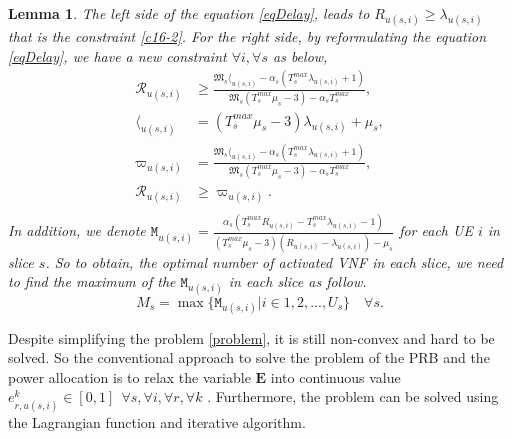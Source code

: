 \documentclass[conference]{IEEEtran}
\newtheorem{lemma}{Lemma}
\begin{document}
\begin{lemma}
The left side of the equation \eqref{eqDelay}, leads to $R_{u(s,i)} \geq \lambda_{u(s,i)}$ that is the constraint \eqref{c16-2}. 
For the right side, by reformulating the equation \eqref{eqDelay}, we have a new constraint $\forall i, \forall s$ as below,
\begin{equation}\label{RM}
\begin{split}
\mathcal{R}_{u(s,i)} &\geq \frac{\mathfrak{M}_s \mathit{\langle}_{u(s,i)} - \alpha_s(T^{max}_s\lambda_{u(s,i)} +1) }{\mathfrak{M}_s (T^{max}_s\mu_s-3)-\alpha_s T^{max}_s},\\
 \mathit{\langle}_{u(s,i)}&=(T^{max}_s\mu_s-3)\lambda_{u(s,i)} + \mu_s,\\
\varpi_{u(s,i)} &= \frac{\mathfrak{M}_s \mathit{\langle}_{u(s,i)} - \alpha_s(T^{max}_s\lambda_{u(s,i)} +1) }{\mathfrak{M}_s (T^{max}_s\mu_s-3)-\alpha_s T^{max}_s},\\
\mathcal{R}_{u(s,i)} &\geq \varpi_{u(s,i)}. \\
\end{split}
\end{equation}
In addition, we denote $\mathtt{M}_{u(s,i)} = \frac{\alpha_s(T^{max}_s R_{u(s,i)}-T^{max}_s\lambda_{u(s,i)} -1)}{(T^{max}_s\mu_s-3)(R_{u(s,i)}-\lambda_{u(s,i)}) - \mu_s }$ for each UE $i$ in slice $s$.
So to obtain, the optimal number of activated VNF in each slice, we need to find the maximum of the
$\mathtt{M}_{u(s,i)}$ in each slice as follow.
\begin{equation}
M_s = \max\{\mathtt{M}_{u(s,i)} | i \in 1,2,..., U_s\} \quad \forall s .
\end{equation}
\end{lemma}
Despite simplifying the problem \eqref{problem}, it is still non-convex and hard to be solved.
So the conventional approach to solve the problem of the PRB and the power allocation is to relax the variable $\mathbf{E}$ into continuous value $e_{r,u(s,i)}^k \in [0,1] \:\: \forall s , \forall i ,\forall r, \forall k$ \cite{lee2018dynamic,ali2018joint}.
Furthermore, the problem can be solved using the Lagrangian function and iterative algorithm.
\end{document}
